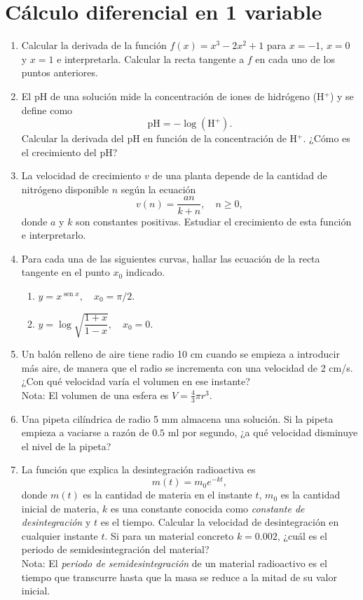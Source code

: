 \documentclass[a4paper,titlepage]{article}
\DeclareMathOperator{\sen}{sen}
\theoremstyle{solution}
\begin{document}
\section{Cálculo diferencial en 1 variable}
\begin{enumerate}[leftmargin=*]
\item Calcular la derivada de la función $f(x)=x^3-2x^2+1$ para $x=-1$, $x=0$ y $x=1$ e interpretarla.
Calcular la recta tangente a $f$ en cada uno de los puntos anteriores.

\item El pH de una solución mide la concentración de iones de hidrógeno (H$^+$) y se define como
\[
\mbox{pH} = -\log(\mbox{H}^+).
\]
Calcular la derivada del pH en función de la concentración de H$^+$. 
¿Cómo es el crecimiento del pH?

\item La velocidad de crecimiento $v$ de una planta depende de la cantidad de nitrógeno disponible $n$ según la ecuación
\[
v(n) = \frac{an}{k+n},	\quad n\geq 0,
\]
donde $a$ y $k$ son constantes positivas.
Estudiar el crecimiento de esta función e interpretarlo. 

\item Para cada una de las siguientes curvas, hallar las ecuación de la recta tangente en el punto $x_{0}$ indicado.
\begin{multicols}{2}
\begin{enumerate}
\item  $y=x^{\sen x},\quad x_{0}=\pi/2$.
\item  $y=\log \sqrt{\dfrac{1+x}{1-x}}, \quad x_{0}=0$.
\end{enumerate}
\end{multicols}

\item Un balón relleno de aire tiene radio 10 cm cuando se empieza a introducir más aire, de manera que el radio se incrementa con una velocidad de 2 cm/s. 
¿Con qué velocidad varía el volumen en ese instante? \\
Nota: El volumen de una esfera es $V=\frac{4}{3}\pi r^3$.

\item Una pipeta cilíndrica de radio 5 mm almacena una solución. 
Si la pipeta empieza a vaciarse a razón de $0.5$ ml por segundo, ¿a qué velocidad disminuye el nivel de la pipeta?   

\item La función que explica la desintegración radioactiva es
\[
m(t) = m_0e^{-kt},
\]
donde $m(t)$ es la cantidad de materia en el instante $t$, $m_0$ es la cantidad inicial de materia, $k$ es una constante conocida como \emph{constante de desintegración} y $t$ es el tiempo.
Calcular la velocidad de desintegración en cualquier instante $t$. Si para un material concreto $k=0.002$, ¿cuál es el periodo de semidesintegración del material?\\
Nota: El \emph{periodo de semidesintegración} de un material radioactivo es el tiempo que transcurre hasta que la masa se reduce a la mitad de su valor inicial.


\end{enumerate}
\end{document}

